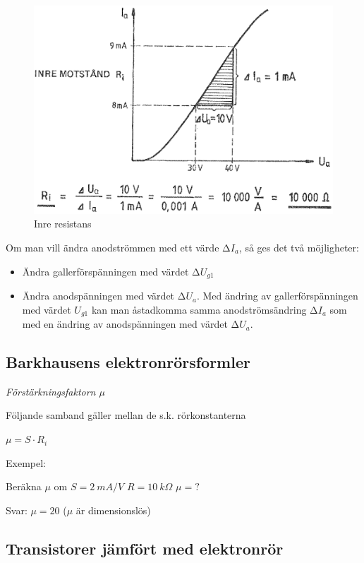 \begin{figure}[h]
\includegraphics[width=\textwidth]{images/cropped_pdfs/bild_2_2-34.pdf}
\caption{Inre resistans}
\label{fig:BildII2-34}
\end{figure}

Om man vill ändra anodströmmen med ett värde \(∆I_a\), så ges det två
möjligheter:
\begin{itemize}
\item Ändra gallerförspänningen med värdet \(∆U_{g1}\)
\item Ändra anodspänningen med värdet \(∆U_a\).
  Med ändring av gallerförspänningen med värdet \(U_{g1}\) kan man åstadkomma
  samma anodströmsändring \(∆I_a\) som med en ändring av anodspänningen med
  värdet \(∆U_a\).
\end{itemize}

\subsection{Barkhausens elektronrörsformler}

\emph{Förstärkningsfaktorn \(\mu \)}

Följande samband gäller mellan de s.k. rörkonstanterna

\(\mu = S \cdot R_i\)

Exempel:

Beräkna \(\mu\)  om \(S = 2\ mA/V\) \(R = 10\ k\Omega\) \(\mu = ?\)

Svar: \(\mu = 20\) (\(\mu\)  är dimensionslös)

\subsection{Transistorer jämfört med elektronrör}

